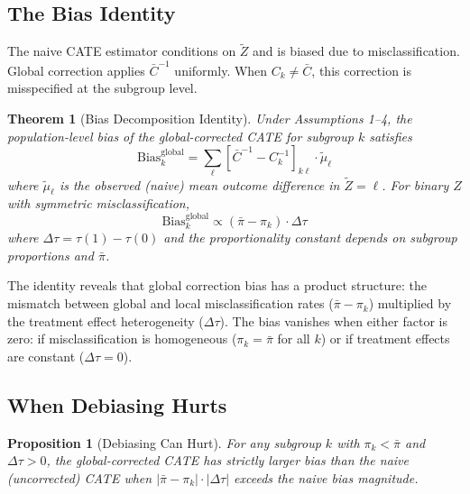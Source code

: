 \documentclass[11pt,twocolumn]{article}
\newtheorem{theorem}{Theorem}
\newtheorem{proposition}{Proposition}
\begin{document}
\subsection{The Bias Identity}
\label{sec:bias_identity}

The naive CATE estimator conditions on $\tilde{Z}$ and is biased due to misclassification. Global correction applies $\bar{C}^{-1}$ uniformly. When $C_k \neq \bar{C}$, this correction is misspecified at the subgroup level.

\begin{theorem}[Bias Decomposition Identity]
\label{thm:bias}
Under Assumptions 1--4, the population-level bias of the global-corrected CATE for subgroup $k$ satisfies
\begin{equation}
\label{eq:bias_identity}
\text{Bias}_k^{\text{global}} = \sum_{\ell} \left[\bar{C}^{-1} - C_k^{-1}\right]_{k\ell} \cdot \tilde{\mu}_\ell
\end{equation}
where $\tilde{\mu}_\ell$ is the observed (naive) mean outcome difference in $\tilde{Z} = \ell$. For binary $Z$ with symmetric misclassification,
\begin{equation}
\label{eq:bias_simple}
\text{Bias}_k^{\text{global}} \propto (\bar{\pi} - \pi_k) \cdot \Delta\tau
\end{equation}
where $\Delta\tau = \tau(1) - \tau(0)$ and the proportionality constant depends on subgroup proportions and $\bar{\pi}$.
\end{theorem}

The identity reveals that global correction bias has a product structure: the mismatch between global and local misclassification rates ($\bar{\pi} - \pi_k$) multiplied by the treatment effect heterogeneity ($\Delta\tau$). The bias vanishes when either factor is zero: if misclassification is homogeneous ($\pi_k = \bar{\pi}$ for all $k$) or if treatment effects are constant ($\Delta\tau = 0$).

\subsection{When Debiasing Hurts}

\begin{proposition}[Debiasing Can Hurt]
\label{prop:hurts}
For any subgroup $k$ with $\pi_k < \bar{\pi}$ and $\Delta\tau > 0$, the global-corrected CATE has strictly larger bias than the naive (uncorrected) CATE when $|\bar{\pi} - \pi_k| \cdot |\Delta\tau|$ exceeds the naive bias magnitude.
\end{proposition}
\end{document}
